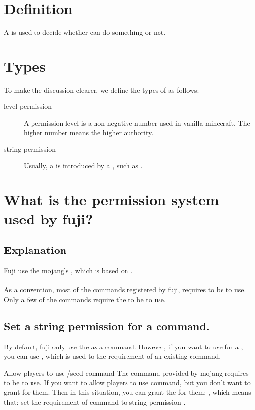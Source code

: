 \section{Definition}
A  is used to decide whether  can do something or not.


\section{Types}
To make the discussion clearer, we define the types of  as follows:
\begin{description}
    \item [level permission] A permission level is a non-negative number used in vanilla minecraft.
    The higher number means the higher authority.
    \item[string permission] Usually, a  is introduced by a , such as .
\end{description}

\clearpage


\section{What is the permission system used by fuji?}

\subsection{Explanation}
Fuji use the mojang's , which is based on .
\\
\\
As a convention, most of the commands registered by fuji, requires  to be  to use.
Only a few of the commands require the  to be  to use.

\subsection{Set a string permission for a command.}
By default, fuji only use the  as  a command.
However, if you want to use  for a , you can use , which is used to  the requirement of an existing command.

\begin{example}{Allow players to use /seed command}
    The command  provided by mojang requires  to be  to use.
    If you want to allow players to use  command, but you don't want to grant  for them.
    Then in this situation, you can grant the  for them: , which means that: set the requirement of command  to string permission .
\end{example}

